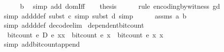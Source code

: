 \begin{isabellebody}
\ \ \ \ \isamarkupfalse%
\ b\ \isamarkupfalse%
\ {\isacharparenleft}{\kern0pt}simp\ add{\isacharcolon}{\kern0pt}\ domIff{\isacharparenright}{\kern0pt}\isanewline
\ \ \isamarkupfalse%
\ {\isacharquery}{\kern0pt}thesis\isanewline
\ \ \ \ \isamarkupfalse%
\ {\isacharparenleft}{\kern0pt}rule\ encoding{\isacharunderscore}{\kern0pt}by{\isacharunderscore}{\kern0pt}witness{\isacharbrackleft}{\kern0pt}\ g{\isacharequal}{\kern0pt}{\isachardoublequoteopen}d{\isachardoublequoteclose}{\isacharbrackright}{\kern0pt}{\isacharparenright}{\kern0pt}\isanewline
\ \ \ \ \isamarkupfalse%
\ {\isacharparenleft}{\kern0pt}simp\ add{\isacharcolon}{\kern0pt}d{\isacharunderscore}{\kern0pt}def{\isacharcomma}{\kern0pt}\ subst\ c{\isacharcomma}{\kern0pt}\ simp{\isacharcomma}{\kern0pt}\ subst\ d{\isacharcomma}{\kern0pt}\ simp{\isacharparenright}{\kern0pt}\isanewline
\ \ \ \ \isamarkupfalse%
\ assms\ a\ b\ \isamarkupfalse%
\ {\isacharparenleft}{\kern0pt}simp\ add{\isacharcolon}{\kern0pt}d{\isacharunderscore}{\kern0pt}def\ decode{\isacharunderscore}{\kern0pt}elim{\isacharunderscore}{\kern0pt}{}{\isacharparenright}{\kern0pt}\isanewline
{}\isamarkupfalse%
%
\endisatagproof
{\isafoldproof}%
%
\isadelimproof
\isanewline
%
\endisadelimproof
\isanewline
{}\isamarkupfalse%
\ dependent{\isacharunderscore}{\kern0pt}bit{\isacharunderscore}{\kern0pt}count{\isacharcolon}{\kern0pt}\isanewline
\ \ {\isachardoublequoteopen}bit{\isacharunderscore}{\kern0pt}count\ {\isacharparenleft}{\kern0pt}{\isacharparenleft}{\kern0pt}e\ {\isasymtimes}\isactrlsub D\ e\ {\isacharparenleft}{\kern0pt}xx\ {\isacharequal}{\kern0pt}\ bit{\isacharunderscore}{\kern0pt}count\ {\isacharparenleft}{\kern0pt}e\ x\ {\isacharplus}{\kern0pt}\ bit{\isacharunderscore}{\kern0pt}count\ {\isacharparenleft}{\kern0pt}e\ x\ x\isanewline
%
\isadelimproof
\ \ %
\endisadelimproof
%
\isatagproof
{}\isamarkupfalse%
\ {\isacharparenleft}{\kern0pt}simp\ add{\isacharcolon}{\kern0pt}bit{\isacharunderscore}{\kern0pt}count{\isacharunderscore}{\kern0pt}append{\isacharparenright}{\kern0pt}%

\end{isabellebody}
